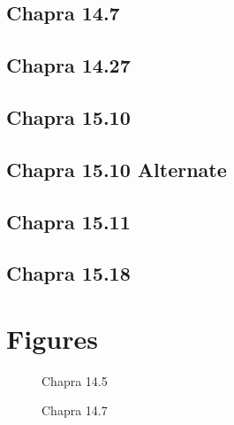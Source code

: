 \documentclass{article}
\begin{document}
\subsection{Chapra 14.7}
%
\pagebreak

\subsection{Chapra 14.27}
%
\pagebreak

\subsection{Chapra 15.10}
%
\pagebreak

\subsection{Chapra 15.10 Alternate}
%
\pagebreak

\subsection{Chapra 15.11}
%
\pagebreak

\subsection{Chapra 15.18}
%
\pagebreak


\section{Figures}
\begin{figure}[h!]
\begin{center}
\caption{Chapra 14.5}
\end{center}
\end{figure}

\begin{figure}[htb!]
\begin{center}
\caption{Chapra 14.7}
\end{center}
\end{figure}
\end{document}
